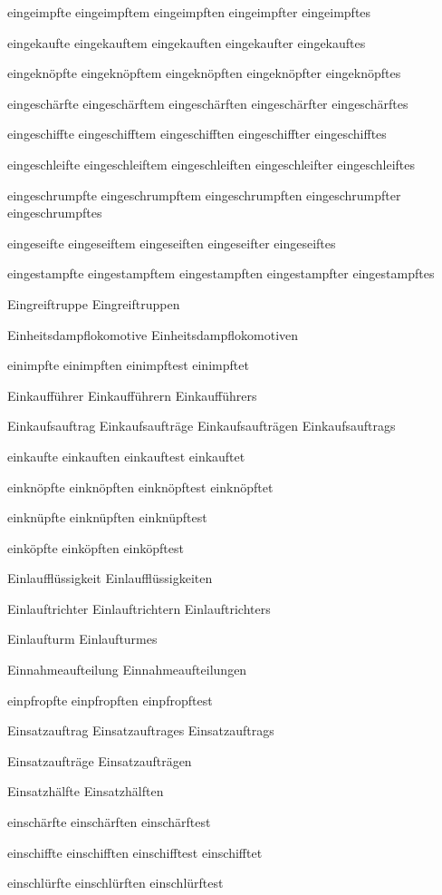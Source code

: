 eingeimpfte
eingeimpftem
eingeimpften
eingeimpfter
eingeimpftes

eingekaufte
eingekauftem
eingekauften
eingekaufter
eingekauftes

eingeknöpfte
eingeknöpftem
eingeknöpften
eingeknöpfter
eingeknöpftes

eingeschärfte
eingeschärftem
eingeschärften
eingeschärfter
eingeschärftes

eingeschiffte
eingeschifftem
eingeschifften
eingeschiffter
eingeschifftes

eingeschleifte
eingeschleiftem
eingeschleiften
eingeschleifter
eingeschleiftes

eingeschrumpfte
eingeschrumpftem
eingeschrumpften
eingeschrumpfter
eingeschrumpftes

eingeseifte
eingeseiftem
eingeseiften
eingeseifter
eingeseiftes

eingestampfte
eingestampftem
eingestampften
eingestampfter
eingestampftes

Eingreiftruppe
Eingreiftruppen

Einheitsdampflokomotive
Einheitsdampflokomotiven

einimpfte
einimpften
einimpftest
einimpftet

Einkaufführer
Einkaufführern
Einkaufführers

Einkaufsauftrag
Einkaufsaufträge
Einkaufsaufträgen
Einkaufsauftrags

einkaufte
einkauften
einkauftest
einkauftet

einknöpfte
einknöpften
einknöpftest
einknöpftet

einknüpfte
einknüpften
einknüpftest

einköpfte
einköpften
einköpftest

Einlaufflüssigkeit
Einlaufflüssigkeiten

Einlauftrichter
Einlauftrichtern
Einlauftrichters

Einlaufturm
Einlaufturmes

Einnahmeaufteilung
Einnahmeaufteilungen

einpfropfte
einpfropften
einpfropftest

Einsatzauftrag
Einsatzauftrages
Einsatzauftrags

Einsatzaufträge
Einsatzaufträgen

Einsatzhälfte
Einsatzhälften

einschärfte
einschärften
einschärftest

einschiffte
einschifften
einschifftest
einschifftet

einschlürfte
einschlürften
einschlürftest

